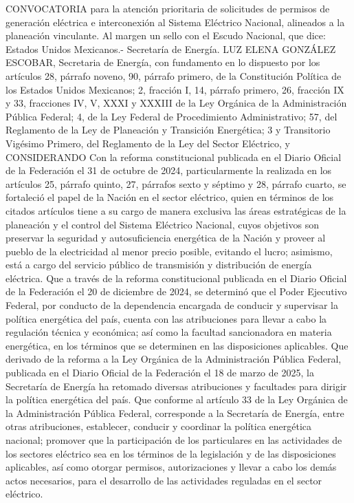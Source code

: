 \begingroup
\senertexto
CONVOCATORIA para la atención prioritaria de solicitudes de permisos de generación eléctrica e interconexión al Sistema Eléctrico Nacional, alineados a la planeación vinculante.
Al margen un sello con el Escudo Nacional, que dice: Estados Unidos Mexicanos.- Secretaría de Energía.
LUZ ELENA GONZÁLEZ ESCOBAR, Secretaria de Energía, con fundamento en lo dispuesto por los artículos 28, párrafo noveno, 90, párrafo primero, de la Constitución Política de los Estados Unidos Mexicanos; 2, fracción I, 14, párrafo primero, 26, fracción IX y 33, fracciones IV, V, XXXI y XXXIII de la Ley Orgánica de la Administración Pública Federal; 4, de la Ley Federal de Procedimiento Administrativo; 57, del Reglamento de la Ley de Planeación y Transición Energética; 3 y Transitorio Vigésimo Primero, del Reglamento de la Ley del Sector Eléctrico, y
CONSIDERANDO
Con la reforma constitucional publicada en el Diario Oficial de la Federación el 31 de octubre de 2024, particularmente la realizada en los artículos 25, párrafo quinto, 27, párrafos sexto y séptimo y 28, párrafo cuarto, se fortaleció el papel de la Nación en el sector eléctrico, quien en términos de los citados artículos tiene a su cargo de manera exclusiva las áreas estratégicas de la planeación y el control del Sistema Eléctrico Nacional, cuyos objetivos son preservar la seguridad y autosuficiencia energética de la Nación y proveer al pueblo de la electricidad al menor precio posible, evitando el lucro; asimismo, está a cargo del servicio público de transmisión y distribución de energía eléctrica.
Que a través de la reforma constitucional publicada en el Diario Oficial de la Federación el 20 de diciembre de 2024, se determinó que el Poder Ejecutivo Federal, por conducto de la dependencia encargada de conducir y supervisar la política energética del país, cuenta con las atribuciones para llevar a cabo la regulación técnica y económica; así como la facultad sancionadora en materia energética, en los términos que se determinen en las disposiciones aplicables.
Que derivado de la reforma a la Ley Orgánica de la Administración Pública Federal, publicada en el Diario Oficial de la Federación el 18 de marzo de 2025, la Secretaría de Energía ha retomado diversas atribuciones y facultades para dirigir la política energética del país.
Que conforme al artículo 33 de la Ley Orgánica de la Administración Pública Federal, corresponde a la Secretaría de Energía, entre otras atribuciones, establecer, conducir y coordinar la política energética nacional; promover que la participación de los particulares en las actividades de los sectores eléctrico sea en los términos de la legislación y de las disposiciones aplicables, así como otorgar permisos, autorizaciones y llevar a cabo los demás actos necesarios, para el desarrollo de las actividades reguladas en el sector eléctrico.
